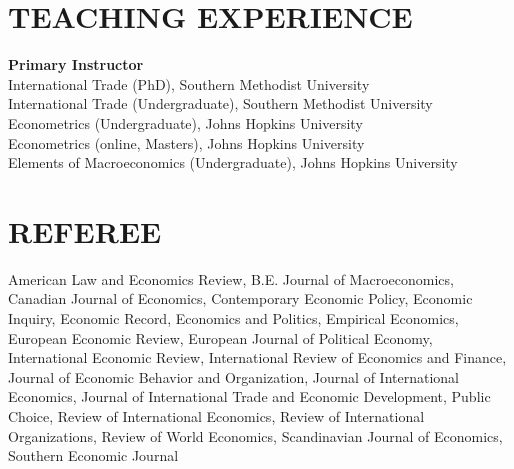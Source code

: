 \documentclass[11pt]{res}
\begin{document}
\begin{resume}
\section{TEACHING EXPERIENCE} \vspace{1.5mm}
{\bf Primary Instructor}\vspace{1.5mm}\\
International Trade (PhD), Southern Methodist University\vspace{1.5mm}\\
International Trade (Undergraduate), Southern Methodist University\vspace{1.5mm}\\
Econometrics (Undergraduate), Johns Hopkins University\vspace{1.5mm}\\
Econometrics (online, Masters), Johns Hopkins University\vspace{1.5mm}\\
Elements of Macroeconomics (Undergraduate), Johns Hopkins University\vspace{1.5mm}\\

\section{REFEREE} \vspace{1.5mm}
American Law and Economics Review, B.E. Journal of Macroeconomics, Canadian Journal of Economics, Contemporary Economic Policy, Economic Inquiry, 
Economic Record, Economics and Politics, Empirical Economics, European Economic Review, European Journal of Political Economy, International Economic Review, International Review of Economics and Finance, Journal of Economic Behavior and Organization, Journal of International Economics, Journal of International Trade and Economic Development, Public Choice, Review of International Economics, Review of International Organizations, Review of World Economics, Scandinavian Journal of Economics, Southern Economic Journal
\end{resume}
\end{document}
